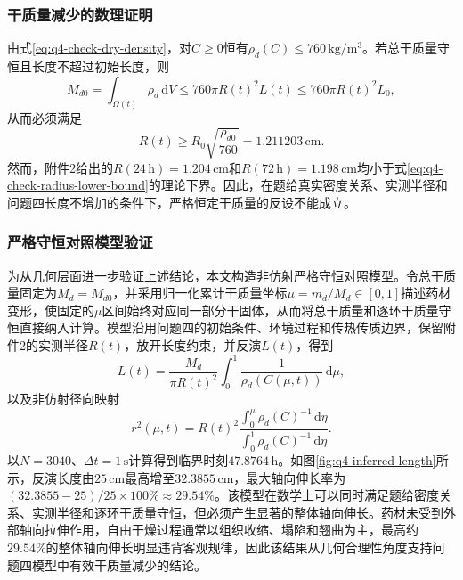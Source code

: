 \documentclass[withoutpreface,bwprint]{cumcmthesis}
\begin{document}
\subsubsection{干质量减少的数理证明}

由式\eqref{eq:q4-check-dry-density}，对$C\ge0$恒有$\rho_d(C)\le760\,\mathrm{kg/m^3}$。若总干质量守恒且长度不超过初始长度，则
\begin{equation}
M_{d0}=\int_{\Omega(t)}\rho_d\,\mathrm dV
\le760\pi R(t)^2L(t)
\le760\pi R(t)^2L_0,
\end{equation}
从而必须满足
\begin{equation}
\boxed{
R(t)\ge R_0\sqrt{\frac{\rho_{d0}}{760}}
=1.211203\,\mathrm{cm}.
}
\label{eq:q4-check-radius-lower-bound}
\end{equation}
然而，附件2给出的$R(24\,\mathrm h)=1.204\,\mathrm{cm}$和$R(72\,\mathrm h)=1.198\,\mathrm{cm}$均小于式\eqref{eq:q4-check-radius-lower-bound}的理论下界。因此，在题给真实密度关系、实测半径和问题四长度不增加的条件下，严格恒定干质量的反设不能成立。

\subsubsection{严格守恒对照模型验证}

为从几何层面进一步验证上述结论，本文构造非仿射严格守恒对照模型。令总干质量固定为$M_d=M_{d0}$，并采用归一化累计干质量坐标$\mu=m_d/M_d\in[0,1]$描述药材变形，使固定的$\mu$区间始终对应同一部分干固体，从而将总干质量和逐环干质量守恒直接纳入计算。模型沿用问题四的初始条件、环境过程和传热传质边界，保留附件2的实测半径$R(t)$，放开长度约束，并反演$L(t)$，得到
\begin{equation}
\boxed{
L(t)=\frac{M_d}{\pi R(t)^2}
\int_0^1\frac{1}{\rho_d(C(\mu,t))}\,\mathrm d\mu,
}
\label{eq:q4-inferred-length}
\end{equation}
以及非仿射径向映射
\begin{equation}
r^2(\mu,t)=R(t)^2
\frac{\displaystyle\int_0^\mu\rho_d(C)^{-1}\,\mathrm d\eta}
{\displaystyle\int_0^1\rho_d(C)^{-1}\,\mathrm d\eta}.
\label{eq:q4-nonaffine-measured-radius}
\end{equation}
以$N=3040$、$\Delta t=1\,\mathrm s$计算得到临界时刻$47.8764\,\mathrm h$。如图\ref{fig:q4-inferred-length}所示，反演长度由$25\,\mathrm{cm}$最高增至$32.3855\,\mathrm{cm}$，最大轴向伸长率为$(32.3855-25)/25\times100\%\approx29.54\%$。该模型在数学上可以同时满足题给密度关系、实测半径和逐环干质量守恒，但必须产生显著的整体轴向伸长。药材未受到外部轴向拉伸作用，自由干燥过程通常以组织收缩、塌陷和翘曲为主，最高约$29.54\%$的整体轴向伸长明显违背客观规律，因此该结果从几何合理性角度支持问题四模型中有效干质量减少的结论。
\end{document}

